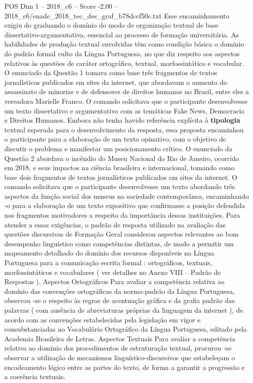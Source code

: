 \begin{textsample}{POS Dim 1 – 2018\_c6 – Score -2.00 – 2018\_c6/enade\_2018\_tec\_des\_graf\_b78dccf50c.txt}
Esse encaminhamento exigiu do graduando o domínio do modo de organização textual de base dissertativo-argumentativa, essencial ao processo de formação universitária.
As habilidades de produção textual envolvidas têm como condição básica o domínio do padrão formal culto da Língua Portuguesa, no que diz respeito aos aspectos relativos às questões de caráter ortográfico, textual, morfossintático e vocabular.
O enunciado da Questão 1 tomava como base três fragmentos de textos jornalísticos publicados em sites da internet, que abordavam o aumento do assassinato de minorias e de defensores de direitos humanos no Brasil, entre eles a vereadora Marielle Franco.
O comando solicitava que o participante desenvolvesse um texto dissertativo e argumentativo com as temáticas Fake News, Democracia e Direitos Humanos.
Embora não tenha havido referência explícita à \textbf{tipologia} textual esperada para o desenvolvimento da resposta, essa proposta encaminhou o participante para a elaboração de um texto opinativo, com o objetivo de discutir o problema e manifestar um posicionamento crítico.
O enunciado da Questão 2 abordava o incêndio do Museu Nacional do Rio de Janeiro, ocorrido em 2018, e seus impactos na ciência brasileira e internacional, tomando como base dois fragmentos de textos jornalísticos publicados em sites da internet.
O comando solicitava que o participante desenvolvesse um texto abordando três aspectos da função social dos museus na sociedade contemporânea, encaminhando -o para a elaboração de um texto expositivo que confirmasse a posição defendida nos fragmentos motivadores a respeito da importância dessas instituições.
Para atender a essas exigências, o padrão de resposta utilizado na avaliação das questões discursivas de Formação Geral considerou aspectos relevantes ao bom desempenho linguístico como competências distintas, de modo a permitir um mapeamento detalhado do domínio dos recursos disponíveis na Língua Portuguesa para a comunicação escrita formal : ortográficos, textuais, morfossintáticos e vocabulares ( ver detalhes no Anexo VIII – Padrão de Respostas ).
Aspectos Ortográficos Para avaliar a competência relativa ao domínio das convenções ortográficas da norma-padrão da Língua Portuguesa, observou -se o respeito às regras de acentuação gráfica e da grafia padrão das palavras ( com ausência de abreviaturas próprias da linguagem da internet ), de acordo com as convenções estabelecidas pela legislação em vigor e consubstanciadas no Vocabulário Ortográfico da Língua Portuguesa, editado pela Academia Brasileira de Letras.
Aspectos Textuais Para avaliar a competência relativa ao domínio dos procedimentos de estruturação textual, procurou -se observar a utilização de mecanismos linguístico-discursivos que estabeleçam o encadeamento lógico entre as partes do texto, de forma a garantir a progressão e a coerência textuais.

\end{textsample}
